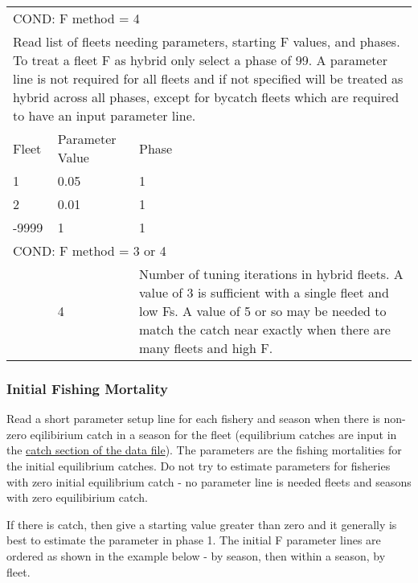 \begin{longtable}{p{1cm} p{3cm} p{11cm}}
   \multicolumn{3}{l}{COND: F method = 4}\Tstrut\\
   \multicolumn{3}{l}{Read list of fleets needing parameters, starting F values, and phases. To treat a fleet F as hybrid only select a phase of 99. A parameter line is not required for all fleets and if not specified will be treated as hybrid across all phases, except for bycatch fleets which are required to have an input parameter line.}\Tstrut\\
   Fleet & Parameter Value & Phase \Tstrut\\
   1 & 0.05 & 1 \\
   2 & 0.01 & 1 \\
   -9999 & 1  & 1 \Bstrut\\
   \hline
   
   \multicolumn{3}{l}{COND: F method = 3 or 4}\Tstrut\\
   & 4 & Number of tuning iterations in hybrid fleets. A value of 3 is sufficient with a single fleet and low Fs.  A value of 5 or so may be needed to match the catch near exactly when there are many fleets and high F. \Bstrut\\
   \hline
\end{longtable}

\hypertarget{InitF}{}
\subsubsection{Initial Fishing Mortality}
Read a short parameter setup line for each fishery and season when there is non-zero eqilibirium catch in a season for the fleet (equilibrium catches are input in the \hyperlink{CatchFormat}{catch section of the data file}). The parameters are the fishing mortalities for the initial equilibrium catches. Do not try to estimate parameters for fisheries with zero initial equilibrium catch - no parameter line is needed fleets and seasons with zero equilibirium catch.

If there is catch, then give a starting value greater than zero and it generally is best to estimate the parameter in phase 1. The initial F parameter lines are ordered as shown in the example below - by season, then within a season, by fleet.

